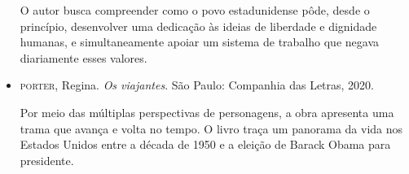 \documentclass[11pt]{extarticle}
\begin{document}
\begin{itemize}
O autor busca compreender como o povo estadunidense pôde, desde o
princípio, desenvolver uma dedicação às ideias de liberdade e dignidade
humanas, e simultaneamente apoiar um sistema de trabalho que negava
diariamente esses valores.

\item\textsc{porter}, Regina. \textit{Os viajantes}. São Paulo: Companhia das
  Letras, 2020.

Por meio das múltiplas perspectivas de personagens, a obra apresenta uma
trama que avança e volta no tempo. O livro traça um panorama da vida nos
Estados Unidos entre a década de 1950 e a eleição de Barack Obama para
presidente.
\end{itemize}
\end{document}
